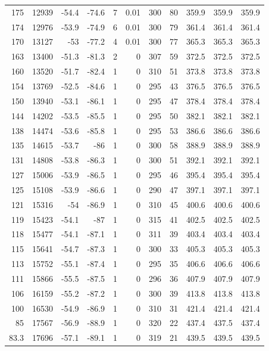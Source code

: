 \documentclass{article}
\begin{document}
\begin{longtable}{r|r|r|r|r|r|r|r|r|r|r}
175 & 12939 & -54.4 & -74.6 & 7 & 0.01 & 300 & 80 & 359.9 & 359.9 & 359.9 \\
174 & 12976 & -53.9 & -74.9 & 6 & 0.01 & 300 & 79 & 361.4 & 361.4 & 361.4 \\
170 & 13127 & -53 & -77.2 & 4 & 0.01 & 300 & 77 & 365.3 & 365.3 & 365.3 \\
163 & 13400 & -51.3 & -81.3 & 2 & 0 & 307 & 59 & 372.5 & 372.5 & 372.5 \\
160 & 13520 & -51.7 & -82.4 & 1 & 0 & 310 & 51 & 373.8 & 373.8 & 373.8 \\
154 & 13769 & -52.5 & -84.6 & 1 & 0 & 295 & 43 & 376.5 & 376.5 & 376.5 \\
150 & 13940 & -53.1 & -86.1 & 1 & 0 & 295 & 47 & 378.4 & 378.4 & 378.4 \\
144 & 14202 & -53.5 & -85.5 & 1 & 0 & 295 & 50 & 382.1 & 382.1 & 382.1 \\
138 & 14474 & -53.6 & -85.8 & 1 & 0 & 295 & 53 & 386.6 & 386.6 & 386.6 \\
135 & 14615 & -53.7 & -86 & 1 & 0 & 300 & 58 & 388.9 & 388.9 & 388.9 \\
131 & 14808 & -53.8 & -86.3 & 1 & 0 & 300 & 51 & 392.1 & 392.1 & 392.1 \\
127 & 15006 & -53.9 & -86.5 & 1 & 0 & 295 & 46 & 395.4 & 395.4 & 395.4 \\
125 & 15108 & -53.9 & -86.6 & 1 & 0 & 290 & 47 & 397.1 & 397.1 & 397.1 \\
121 & 15316 & -54 & -86.9 & 1 & 0 & 310 & 45 & 400.6 & 400.6 & 400.6 \\
119 & 15423 & -54.1 & -87 & 1 & 0 & 315 & 41 & 402.5 & 402.5 & 402.5 \\
118 & 15477 & -54.1 & -87.1 & 1 & 0 & 311 & 39 & 403.4 & 403.4 & 403.4 \\
115 & 15641 & -54.7 & -87.3 & 1 & 0 & 300 & 33 & 405.3 & 405.3 & 405.3 \\
113 & 15752 & -55.1 & -87.4 & 1 & 0 & 295 & 35 & 406.6 & 406.6 & 406.6 \\
111 & 15866 & -55.5 & -87.5 & 1 & 0 & 296 & 36 & 407.9 & 407.9 & 407.9 \\
106 & 16159 & -55.2 & -87.2 & 1 & 0 & 300 & 39 & 413.8 & 413.8 & 413.8 \\
100 & 16530 & -54.9 & -86.9 & 1 & 0 & 310 & 31 & 421.4 & 421.4 & 421.4 \\
85 & 17567 & -56.9 & -88.9 & 1 & 0 & 320 & 22 & 437.4 & 437.5 & 437.4 \\
83.3 & 17696 & -57.1 & -89.1 & 1 & 0 & 319 & 21 & 439.5 & 439.5 & 439.5 \\

\end{longtable}
\end{document}
